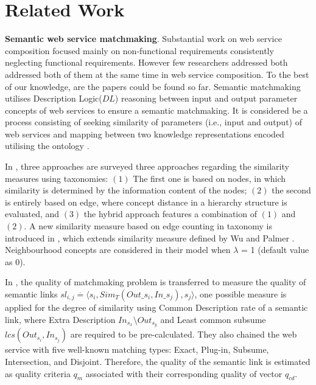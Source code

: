 \documentclass{llncs}
\begin{document}
\section{Related Work} \label{relatedWork}
\textbf{Semantic web service matchmaking}. Substantial work \cite{bansal2016generalized,mier2015integrated,da2016particle,da2015graphevol,yu2013adaptive} on web service composition focused mainly on non-functional requirements consistently neglecting functional requirements. However few researchers addressed both addressed both of them at the same time in web service composition. To the best of our knowledge, \cite{fanjiang2014semantic,lecue2009optimizing} are the papers could be found so far. Semantic matchmaking utilises Description Logic($DL$) \cite{baader2003description} reasoning between input and output parameter concepts of web services to ensure a semantic matchmaking. It is considered be a process consisting of seeking similarity of parameters (i.e., input and output) of web services and mapping between two knowledge representations encoded utilising the ontology \cite{lecue2006formal}.

In \cite{shet2012new}, three approaches are surveyed three approaches regarding the similarity measures using taxonomies: $(1)$ The first one is based on nodes, in which similarity is determined by the information content of the nodes; $(2)$ the second is entirely based on edge, where concept distance in a hierarchy structure is evaluated, and $(3)$ the hybrid approach features a combination of $(1)$ and $(2)$. A new similarity measure based on edge counting in taxonomy is introduced in \cite{shet2012new}, which extends similarity measure defined by Wu and Palmer \cite{wu1994verbs}. Neighbourhood concepts are considered in their model when $\lambda$ = 1 (default value as 0).

In \cite{lecue2009optimizing}, the quality of matchmaking problem is transferred to measure the quality of semantic links $sl_{i,j} \stackrel{.}{=} \langle s_{i}, Sim_{T}(Out\_s_i,In\_s_j),s_{j}  \rangle$, one possible measure is applied for the degree of similarity using Common Description rate of a semantic link, where Extra Description $In_{s_{x}} \setminus Out_{s_{y}}$ and Least common subsume $lcs(Out_{s_i},In_{s_j})$ are required to be pre-calculated. They also chained the web service with five well-known matching types: Exact, Plug-in, Subsume, Intersection, and Disjoint. Therefore, the quality of the semantic link is estimated as quality criteria $q_{m}$ associated with their corresponding quality of vector $q_{cd}$.
\end{document}
